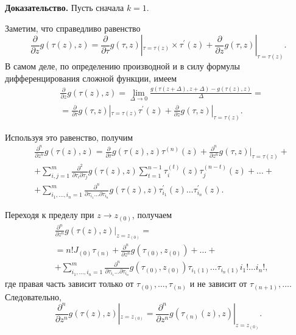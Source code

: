      \textbf{ Доказательство.} Пусть сначала $k=1$.

     Заметим, что справедливо равенство
     $$
     \frac{\partial}{\partial z}
     g\left(\tau(z),z\right)=\frac{\partial}{\partial \tau}
     g(\tau,z)|_{\tau=\tau(z)} \times
     \tau^{'}(z)+\frac{\partial}{\partial z} g(\tau,z)|_{\tau=\tau(z)}.
     $$
     В самом деле, по определению производной и в силу формулы
     дифференцирования сложной функции, имеем \begin{align}
     &\frac{\partial}{\partial z} g(\tau(z),z)=\lim_{\Delta\to 0}
     \frac{g(\tau(z+\Delta),z+\Delta)-g(\tau(z),z)}{\Delta} = \nonumber\\
         &=\frac{\partial}{\partial \tau} g(\tau,z)|_{\tau=\tau(z)}
         \tau^{'}(z)+ \frac{\partial}{\partial z} g(\tau,z)|_{\tau=\tau(z)}.
         \nonumber\end{align}

         Используя это равенство, получим \begin{align} 
         &\frac{\partial^n}{\partial
             z^n} g(\tau(z),z)= \frac{\partial}{\partial \tau}g(\tau(z),z)
    \tau^{(n)}(z) +
    \frac{\partial^n}{\partial z^n} g(\tau,z)|_{\tau=\tau(z)}+\nonumber \\
        &+\sum^m_{i,j=1}\frac{\partial^2}{\partial\tau_i\partial\tau_j}
        g\left(\tau(z),z\right)\sum^{n-1}_{t=1}\tau^{(t)}_i(z)\tau^{(n-t)}_j(z)
    +\ldots+\nonumber\\
        &+\sum^m_{i_1,\ldots,i_n=1}
        \frac{\partial^n}{\partial\tau_{i_1}\ldots\partial\tau_{i_n}}
        g\left(\tau(z),z\right) \tau^{'}_{i_1}(z)\ldots
        \tau^{'}_{i_n}(z).\nonumber 
        \end{align}

        Переходя к пределу при $z\to z_{(0)}$, получаем \begin{align}
        &\frac{\partial^n}{\partial z^n} g(\tau(z),z)|_{z=z_{(0)}}= \nonumber \\
            &=n! J_{(0)}\tau_{(n)}+\frac{\partial^n}{\partial z^n}
            g(\tau_{(0)},
                    z_{(0)})+\ldots+  \\
                &+\sum^m_{i_1,\ldots,i_n=1}
                \frac{\partial^n}{\partial\tau_{i_1}\ldots\partial\tau_{i_n}}
                g(\tau_{(0)},z_{(0)})\tau_{i_1(1)}\ldots\tau_{i_n(1)} i_1!\ldots
                i_n!, \nonumber
                 \end{align} 
                где правая часть зависит только от
                $\tau_{(0)},\ldots,\tau_{(n)}$ и не зависит от
                $\tau_{(n+1)},\ldots$. Следовательно,
                $$
                \frac{\partial^n}{\partial z^n} g\left(\tau(z),z\right)|_{z=z_{(0)}}
                = \frac{\partial^n}{\partial z^n}
                g\left(\tau_{(n)}(z),z\right)|_{z=z_{(0)}}.
                $$

